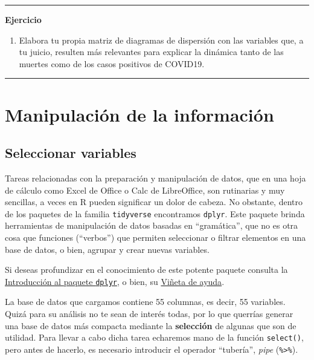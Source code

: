 \documentclass[
  11pt,
  oneside]{book}
\providecommand{\tightlist}{%
  \setlength{\itemsep}{0pt}\setlength{\parskip}{0pt}}
\begin{document}
\begin{center}\rule{0.5\linewidth}{0.5pt}\end{center}

\textbf{Ejercicio}

\begin{enumerate}
\def\labelenumi{\roman{enumi})}
\tightlist
\item
  Elabora tu propia matriz de diagramas de dispersión con las variables que, a tu juicio, resulten más relevantes para explicar la dinámica tanto de las muertes como de los casos positivos de COVID19.
\end{enumerate}

\begin{center}\rule{0.5\linewidth}{0.5pt}\end{center}

\hypertarget{manipulaciuxf3n-de-la-informaciuxf3n}{%
\section{Manipulación de la información}\label{manipulaciuxf3n-de-la-informaciuxf3n}}

\hypertarget{seleccionar-variables}{%
\subsection{Seleccionar variables}\label{seleccionar-variables}}

Tareas relacionadas con la preparación y manipulación de datos, que en una hoja de cálculo como Excel de Office o Calc de LibreOffice, son rutinarias y muy sencillas, a veces en R pueden significar un dolor de cabeza. No obstante, dentro de los paquetes de la familia \texttt{tidyverse} encontramos \texttt{dplyr}. Este paquete brinda herramientas de manipulación de datos basadas en ``gramática'', que no es otra cosa que funciones (``verbos'') que permiten seleccionar o filtrar elementos en una base de datos, o bien, agrupar y crear nuevas variables.

Si deseas profundizar en el conocimiento de este potente paquete consulta la \href{https://dplyr.tidyverse.org/}{Introducción al paquete \texttt{dplyr}}, o bien, su \href{http://127.0.0.1:28602/library/dplyr/doc/dplyr.html}{Viñeta de ayuda}.

La base de datos que cargamos contiene 55 columnas, es decir, 55 variables. Quizá para su análisis no te sean de interés todas, por lo que querrías generar una base de datos más compacta mediante la \textbf{selección} de algunas que son de utilidad. Para llevar a cabo dicha tarea echaremos mano de la función \texttt{select()}, pero antes de hacerlo, es necesario introducir el operador ``tubería'', \emph{pipe} (\texttt{\%\textgreater{}\%}).
\end{document}
